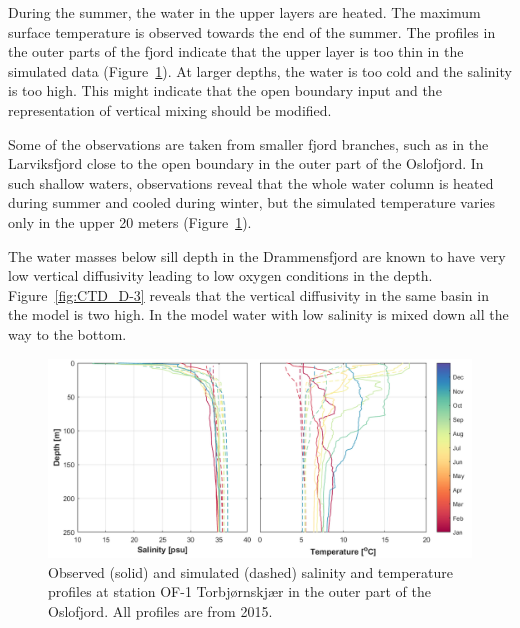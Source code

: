 During the summer, the water in the upper layers are heated. The maximum surface temperature is observed towards the end of the summer. The profiles in the outer parts of the fjord indicate that the upper layer is too thin in the simulated data (Figure~\ref{fig:CTD_OF-1}). At larger depths, the water is too cold and the salinity is too high. This might indicate that the open boundary input and the representation of vertical mixing should be modified. 

Some of the observations are taken from smaller fjord branches, such as in the Larviksfjord close to the open boundary in the outer part of the Oslofjord. In such shallow waters, observations reveal that the whole water column is heated during summer and cooled during winter, but the simulated temperature varies only in the upper 20 meters (Figure~\ref{fig:CTD_OF-1}). 

The water masses below sill depth in the Drammensfjord are known to have very low vertical diffusivity leading to low oxygen conditions in the depth. Figure~\ref{fig:CTD_D-3} reveals that the vertical diffusivity in the same basin in the model is two high. In the model water with low salinity is mixed down all the way to the bottom. 

\begin{figure}[tbh]
	\centerline{
		\includegraphics*[trim=0cm 0cm 0cm 0cm,clip=true,width=\textwidth]{Figurer/CTD_OF-1} }
	\caption{\small Observed (solid) and simulated (dashed) salinity and temperature profiles at station OF-1 Torbj{\o}rnskj{\ae}r in the outer part of the Oslofjord. All profiles are from 2015.}
	\label{fig:CTD_OF-1}
\end{figure}

